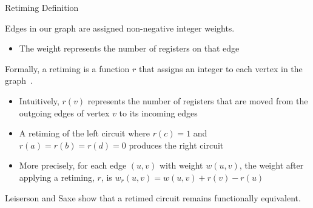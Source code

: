 \begin{frame}{Retiming Definition}

  Edges in our graph are assigned non-negative integer weights.

  \begin{itemize}
    \item The weight represents the number of registers on that edge
  \end{itemize}

  Formally, a retiming is a function $r$ that assigns an integer to each vertex in the graph~.

  \begin{itemize}
    \item Intuitively, $r(v)$ represents the number of registers that are moved from the outgoing edges of vertex $v$ to its incoming edges
    \item A retiming of the left circuit where $r(c) = 1$ and $r(a)=r(b)=r(d)=0$ produces the right circuit
    \item More precisely, for each edge $(u, v)$ with weight $w(u, v)$, the weight after applying a retiming, $r$, is $w_r(u, v) = w(u, v) + r(v) - r(u)$
  \end{itemize}
  Leiserson and Saxe show that a retimed circuit remains functionally equivalent.


\end{frame}

